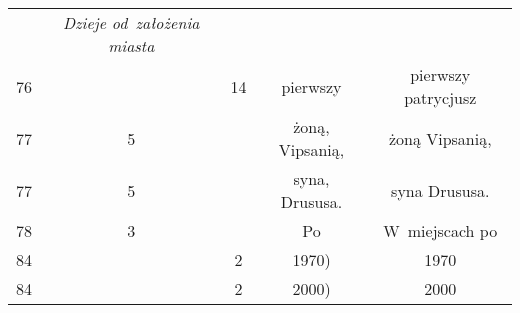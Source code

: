 \documentclass[a4paper,11pt]{article}
\numberwithin{equation}{section}
\begin{document}
\begin{center}
\begin{tabular}{|c|c|c|c|c|}
    & \textit{Dzieje od~założenia miasta} \\
    76 & & 14 & pierwszy & pierwszy patrycjusz \\
    77 & \hphantom{0}5 & & żoną, Vipsanią, & żoną Vipsanią, \\
    77 & \hphantom{0}5 & & syna, Drususa. & syna Drususa. \\
    78 & \hphantom{0}3 & & Po & W~miejscach po \\
    84 & & \hphantom{0}2 & 1970) & 1970 \\
    84 & & \hphantom{0}2 & 2000) & 2000 \\
    \hline
  \end{tabular}





  \newpage


\end{center}
\end{document}
